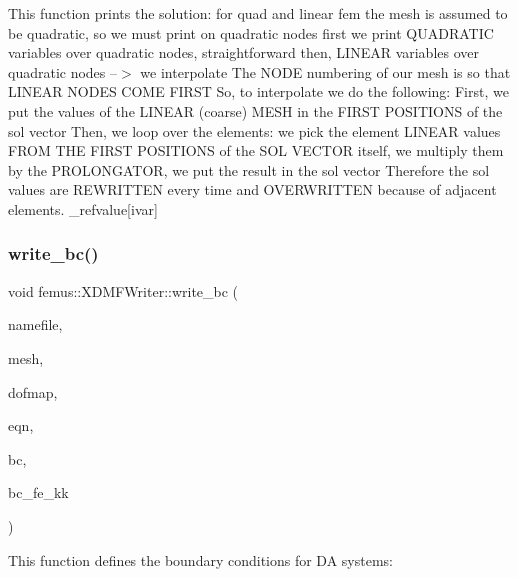 This function prints the solution\+: for quad and linear fem the mesh is assumed to be quadratic, so we must print on quadratic nodes first we print Q\+U\+A\+D\+R\+A\+T\+IC variables over quadratic nodes, straightforward then, L\+I\+N\+E\+AR variables over quadratic nodes --$>$ we interpolate The N\+O\+DE numbering of our mesh is so that L\+I\+N\+E\+AR N\+O\+D\+ES C\+O\+ME F\+I\+R\+ST So, to interpolate we do the following\+: First, we put the values of the L\+I\+N\+E\+AR (coarse) M\+E\+SH in the F\+I\+R\+ST P\+O\+S\+I\+T\+I\+O\+NS of the sol vector Then, we loop over the elements\+: we pick the element L\+I\+N\+E\+AR values F\+R\+OM T\+HE F\+I\+R\+ST P\+O\+S\+I\+T\+I\+O\+NS of the S\+OL V\+E\+C\+T\+OR itself, we multiply them by the P\+R\+O\+L\+O\+N\+G\+A\+T\+OR, we put the result in the sol vector Therefore the sol values are R\+E\+W\+R\+I\+T\+T\+EN every time and O\+V\+E\+R\+W\+R\+I\+T\+T\+EN because of adjacent elements. \+\_\+refvalue\mbox{[}ivar\mbox{]} \mbox{\label{classfemus_1_1_x_d_m_f_writer_a6330529e2c5cef355c4a11bad0c382d2}} 
\subsubsection{\texorpdfstring{write\+\_\+bc()}{write\_bc()}}
{\footnotesize\ttfamily void femus\+::\+X\+D\+M\+F\+Writer\+::write\+\_\+bc (\begin{DoxyParamCaption}\item[{const std\+::string}]{namefile,  }\item[{const \mbox{\hyperlink{classfemus_1_1_multi_level_mesh_two}{Multi\+Level\+Mesh\+Two}} $\ast$}]{mesh,  }\item[{const \mbox{\hyperlink{classfemus_1_1_dof_map}{Dof\+Map}} $\ast$}]{dofmap,  }\item[{const \mbox{\hyperlink{classfemus_1_1_system_two}{System\+Two}} $\ast$}]{eqn,  }\item[{const int $\ast$}]{bc,  }\item[{int $\ast$$\ast$}]{bc\+\_\+fe\+\_\+kk }\end{DoxyParamCaption})\hspace{0.3cm}{\ttfamily [static]}}



This function defines the boundary conditions for DA systems\+: 


